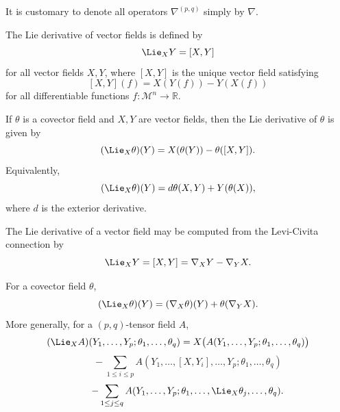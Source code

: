 \begin{remark}
\label{appa-rem-abuse-notation-covariant-derivatives}

It is customary to denote all operators \(\nabla^{(p,q)}\) simply by \(\nabla\).
\end{remark}

\begin{definition}
\label{appa-def-lie-derivative-vector}

The Lie derivative of vector fields is defined by
\[
\Lie_X Y=[X,Y]
\]
for all vector fields \(X,Y\), where \([X,Y]\) is the unique vector field satisfying
\[
[X,Y](f)=X(Y(f))-Y(X(f))
\]
for all differentiable functions \(f:\mathcal M^n\to\mathbb R\).
\end{definition}

\begin{definition}
\label{appa-def-lie-derivative-covector}

If \(\theta\) is a covector field and \(X,Y\) are vector fields, then the Lie derivative of \(\theta\) is given by
\[
(\Lie_X \theta)(Y)=X(\theta(Y))-\theta([X,Y]).
\]
Equivalently,
\[
(\Lie_X \theta)(Y)=d\theta(X,Y)+Y(\theta(X)),
\]
where \(d\) is the exterior derivative.
\end{definition}

\begin{remark}
\label{appa-rem-lie-bracket-via-connection}

The Lie derivative of a vector field may be computed from the Levi-Civita connection by
\[
\Lie_XY=[X,Y]=\nabla_XY-\nabla_YX.
\]
\end{remark}

\begin{remark}
\label{appa-rem-lie-derivative-tensors}

For a covector field \(\theta\),
\[
(\Lie_X \theta)(Y)=(\nabla_X\theta)(Y)+\theta(\nabla_YX).
\]
More generally, for a \((p,q)\)-tensor field \(A\),
\[
(\Lie_X A)(Y_1,\ldots,Y_p;\theta_1,\ldots,\theta_q)
=X\bigl(A(Y_1,\ldots,Y_p;\theta_1,\ldots,\theta_q)\bigr)
\]
\[
\qquad - \sum_{1\le i\le p} A(Y_1,\ldots,[X,Y_i],\ldots,Y_p;\theta_1,\ldots,\theta_q)
\]
\[
\qquad - \sum_{1\le j\le q} A(Y_1,\ldots,Y_p;\theta_1,\ldots,\Lie_X\theta_j,\ldots,\theta_q).
\]
\end{remark}

